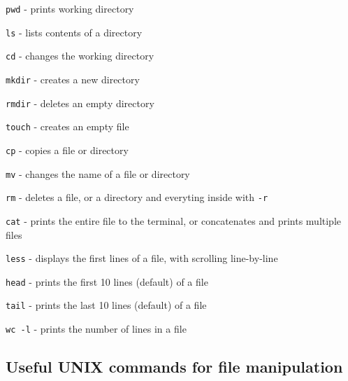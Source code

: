 \documentclass[]{book}
\begin{document}
\texttt{pwd} - prints working directory

\texttt{ls} - lists contents of a directory

\texttt{cd} - changes the working directory

\texttt{mkdir} - creates a new directory

\texttt{rmdir} - deletes an empty directory

\texttt{touch} - creates an empty file

\texttt{cp} - copies a file or directory

\texttt{mv} - changes the name of a file or directory

\texttt{rm} - deletes a file, or a directory and everyting inside with \texttt{-r}

\texttt{cat} - prints the entire file to the terminal, or concatenates and prints multiple files

\texttt{less} - displays the first lines of a file, with scrolling line-by-line

\texttt{head} - prints the first 10 lines (default) of a file

\texttt{tail} - prints the last 10 lines (default) of a file

\texttt{wc\ -l} - prints the number of lines in a file

\hypertarget{useful-unix-commands-for-file-manipulation}{%
\subsection{Useful UNIX commands for file manipulation}\label{useful-unix-commands-for-file-manipulation}}
\end{document}
